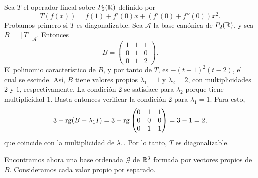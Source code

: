 \documentclass[12pt,a4paper]{book}
\begin{document}
    \begin{ejemplo}
        Sea $T$ el operador lineal sobre $P_2(\mathbb{R})$ definido por
        \begin{equation*}
            T(f(x))=f(1)+f'(0)x+(f'(0)+f''(0))x^2.
        \end{equation*}
        Probamos primero si $T$ es diagonalizable. Sea $\mathcal{A}$ la base canónica de $P_2(\mathbb{R})$, y sea $B=[T]_{\mathcal{A}}$. Entonces
        \begin{equation*}
            B=\begin{pmatrix}1&1&1\\0&1&0\\0&1&2\end{pmatrix}.
        \end{equation*}
        El polinomio característico de $B$, y por tanto de $T$, es $-(t-1)^2(t-2)$, el cual se escinde. Así, $B$ tiene valores propios $\lambda_1=1$ y $\lambda_2=2$, con multiplicidades $2$ y $1$, respectivamente. La condición 2 se satisface para $\lambda_2$ porque tiene multiplicidad $1$. Basta entonces verificar la condición 2 para $\lambda_1=1$. Para esto,
        \begin{equation*}
            3-\operatorname{rg}(B-\lambda_1 I)=3-\operatorname{rg}\begin{pmatrix}0&1&1\\0&0&0\\0&1&1\end{pmatrix}=3-1=2,
        \end{equation*}
        que coincide con la multiplicidad de $\lambda_1$. Por lo tanto, $T$ es diagonalizable.

        Encontramos ahora una base ordenada $\mathcal{G}$ de $\mathbb{R}^3$ formada por vectores propios de $B$. Consideramos cada valor propio por separado.


\end{ejemplo}
\end{document}
